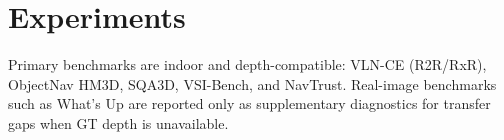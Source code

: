 \section{Experiments}
Primary benchmarks are indoor and depth-compatible: VLN-CE (R2R/RxR), ObjectNav HM3D, SQA3D,
VSI-Bench, and NavTrust. Real-image benchmarks such as What's Up are reported only as supplementary
diagnostics for transfer gaps when GT depth is unavailable.
